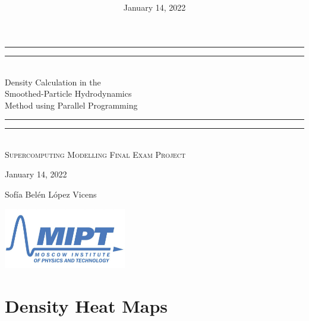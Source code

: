 \documentclass[a4paper,12pt]{article}
\author{}
\title{\\
\large \\
\small }
\date{January 14, 2022}
\begin{document}

  \begin{titlepage}
    \centering
    \vspace*{\baselineskip}
    \rule{\textwidth}{1.6pt}\vspace*{-\baselineskip}\vspace*{2pt}
    \rule{\textwidth}{0.4pt}\\[\baselineskip]
    {\LARGE Density Calculation in the \\[0.1\baselineskip]
        Smoothed-Particle Hydrodynamics \\[0.3\baselineskip]
    Method using Parallel Programming}\\[0.2\baselineskip]
  
    \rule{\textwidth}{0.4pt}\vspace*{-\baselineskip}\vspace{3.2pt}
    \rule{\textwidth}{1.6pt}\\[\baselineskip]
    \scshape
    Supercomputing Modelling Final Exam Project\\
    \par
    January 14, 2022\\
    \vspace*{2\baselineskip}
    {\Large  Sof\'ia Bel\'en L\'opez Vicens\par}
    \vspace*{2\baselineskip}

    \vfill
    \includegraphics[width=0.4\textwidth]{img/mipt.jpg}
  \end{titlepage}

\newpage
\section{Density Heat Maps}
\end{document}
